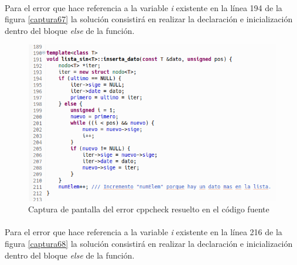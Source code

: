 			\paragraph{}Para el error que hace referencia a la variable \textit{i} existente en la línea 194 de la figura \ref*{captura67} la solución consistirá en realizar la declaración e inicialización dentro del bloque \textit{else} de la función.
			
			\begin{figure}[H]
				\centering
				\includegraphics[scale=0.7]{img/captura77.png}
				\caption{Captura de pantalla del error cppcheck  resuelto en el código fuente}
				\label{captura77}
			\end{figure}
		
			\paragraph{}Para el error que hace referencia a la variable \textit{i} existente en la línea 216 de la figura \ref*{captura68} la solución consistirá en realizar la declaración e inicialización dentro del bloque \textit{else} de la función.
			
